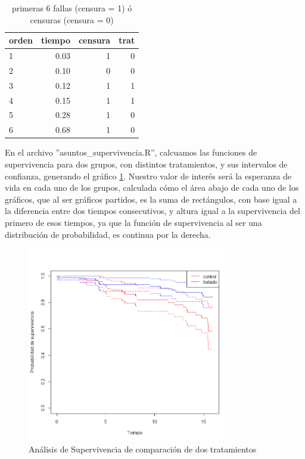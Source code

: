 \documentclass[12pt]{article}
\begin{document}
\begin{table}[ht]
\centering
\begin{tabular}{lrrr}
  \hline
orden & tiempo & censura & trat \\ 
  \hline
1 & 0.03 & 1 & 0 \\ 
  2 & 0.10 & 0 & 0 \\ 
  3 & 0.12 & 1 & 1 \\ 
  4 & 0.15 & 1 & 1 \\ 
  5 & 0.28 & 1 & 0 \\ 
  6 & 0.68 & 1 & 0 \\ 
   \hline
\end{tabular}
\caption{primeras 6 fallas (censura = 1) ó censuras (censura = 0)}
\end{table}

En el archivo ''asuntos\_supervivencia.R'', calcuamos las funciones de supervivencia para dos grupos, con distintos tratamientos, y sus intervalos de confianza, generando el gráfico \ref{fig:7}. Nuestro valor de interés será la esperanza de vida en cada uno de los grupos, calculada cómo el área abajo de cada uno de los gráficos, que al ser gráficos partidos, es la suma de rectángulos, con base igual a la diferencia entre dos tiempos consecutivos, y altura igual a la supervivencia del primero de esos tiempos, ya que la función de supervivencia al ser una distribución de probabilidad, es continua por la derecha.\\

\begin{figure}[H]
    \centering
    \includegraphics[width=0.8\textwidth]{grafi/supervivencia_dos_tratamientos.jpg}
    \caption{Análisis de Supervivencia de comparación de dos tratamientos}
    \label{fig:7}
\end{figure}
\end{document}
